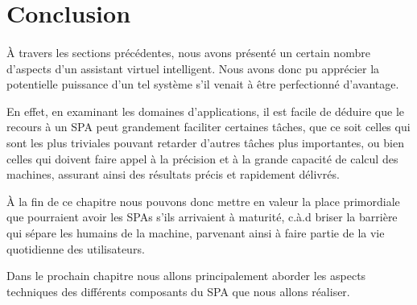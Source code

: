 \section{Conclusion}
\paragraph{}
À travers les sections précédentes, nous avons présenté un certain nombre d'aspects d'un assistant virtuel intelligent. Nous avons donc pu apprécier la potentielle puissance d'un tel système s'il venait à être perfectionné d'avantage.
\par En effet, en examinant les domaines d'applications, il est facile de déduire que le recours à un SPA peut grandement faciliter certaines tâches, que ce soit celles qui sont les plus triviales pouvant retarder d'autres tâches plus importantes, ou bien celles qui doivent faire appel à la précision et à la grande capacité de calcul des machines, assurant ainsi des résultats précis et rapidement délivrés.
\par
À la fin de ce chapitre nous pouvons donc mettre en valeur la place primordiale que pourraient avoir les SPAs s'ils arrivaient à maturité, c.à.d briser la barrière qui sépare les humains de la machine, parvenant ainsi à faire partie de la vie quotidienne des utilisateurs. 
\par Dans le prochain chapitre nous allons principalement aborder les aspects techniques des différents composants du SPA que nous allons réaliser.

 
